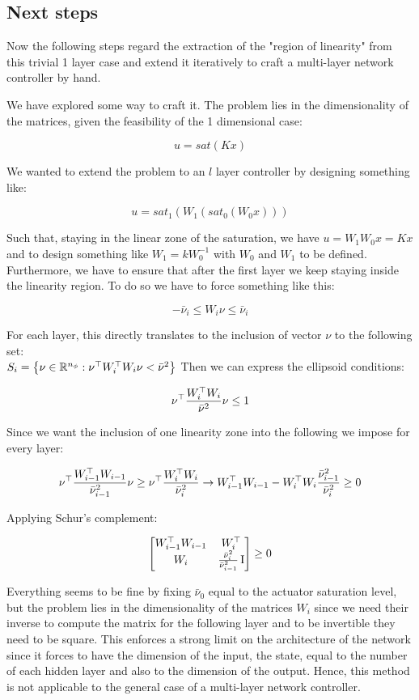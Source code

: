 \documentclass{article}
\begin{document}
\subsection*{Next steps}
Now the following steps regard the extraction of the "region of linearity" from this trivial 1 layer case and extend it iteratively to craft a multi-layer network controller by hand.

We have explored some way to craft it. The problem lies in the dimensionality of the matrices, given the feasibility of the 1 dimensional case:

$$
  u = sat(Kx)
$$

We wanted to extend the problem to an $l$ layer controller by designing something like:

$$
  u = sat_1 \left( W_1 \left( sat_0 \left( W_0 x \right) \right) \right)
$$

Such that, staying in the linear zone of the saturation, we have $u = W_1 W_0 x = K x$ and to design something like $W_1 = k W_0^{-1}$ with $W_0$ and $W_1$ to be defined. Furthermore, we have to ensure that after the first layer we keep staying inside the linearity region. To do so we have to force something like this:

$$
  -\bar{\nu}_i \leq W_i \nu \leq \bar{\nu}_i
$$

For each layer, this directly translates to the inclusion of vector $\nu$ to the following set: \\ $ S_i = \left\{ \nu \in {\mathbb{R}}^{n_{\phi}} : \nu^\top W_i^\top W_i \nu < \bar{\nu}^{2} \right\}$
Then we can express the ellipsoid conditions:

$$
  \nu^\top \frac{W_i^\top W_i}{\bar{\nu}^{2}} \nu \leq 1
$$

Since we want the inclusion of one linearity zone into the following we impose for every layer:

$$
  \nu^\top \frac{W_{i-1}^\top W_{i-1}}{\bar{\nu}_{i-1}^{2}} \nu \geq \nu^\top \frac{W_{i}^\top W_{i}}{\bar{\nu}_{i}^{2}} \to W_{i-1}^\top W_{i-1} - W_{i}^\top W_{i} \frac{\bar{\nu}_{i-1}^{2}}{\bar{\nu}_{i}^{2}} \geq 0
$$

Applying Schur's complement:

$$
  \left[\begin{matrix}
    W_{i-1}^\top W_{i-1} & W_{i}^\top \\
    W_{i} & \frac{\bar{\nu}_{i}^{2}}{\bar{\nu}_{i-1}^{2}} \operatorname{I}
  \end{matrix}\right] \geq 0
$$

Everything seems to be fine by fixing $\bar{\nu}_0$ equal to the actuator saturation level, but the problem lies in the dimensionality of the matrices $W_i$ since we need their inverse to compute the matrix for the following layer and to be invertible they need to be square. This enforces a strong limit on the architecture of the network since it forces to have the dimension of the input, the state, equal to the number of each hidden layer and also to the dimension of the output. Hence, this method is not applicable to the general case of a multi-layer network controller.

\pagebreak
\printbibliography
\end{document}
